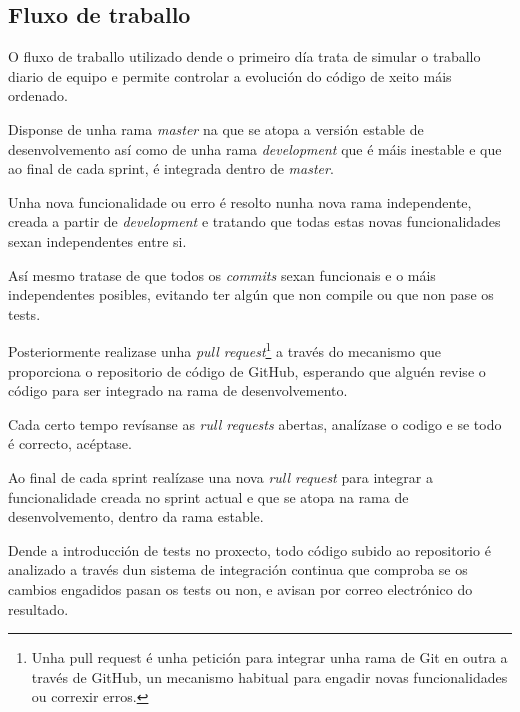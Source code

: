     \subsection{Fluxo de traballo}
    O fluxo de traballo utilizado dende o primeiro día trata de simular o 
traballo diario de equipo e permite controlar a evolución do código de xeito 
máis ordenado.

    Disponse de unha rama \emph{master} na que se atopa a versión estable de 
desenvolvemento así como de unha rama \emph{development} que é máis inestable e 
que ao final de cada sprint, é integrada dentro de \emph{master}.

    Unha nova funcionalidade ou erro é resolto nunha nova rama independente,
creada a partir de \emph{development} e tratando que todas estas novas 
funcionalidades sexan independentes entre si.

    Así mesmo tratase de que todos os \emph{commits} sexan funcionais e o máis 
independentes posibles, evitando ter algún que non compile ou que non pase 
os tests.

    Posteriormente realizase unha \emph{pull request}\footnote{Unha pull 
request é unha petición para integrar unha rama de Git en outra a través de 
GitHub, un mecanismo habitual para engadir novas funcionalidades ou correxir 
erros.} a través do mecanismo que proporciona o repositorio 
de código de GitHub, esperando que alguén revise o código para ser 
integrado na rama de desenvolvemento.

    Cada certo tempo revísanse as \emph{rull requests} abertas, analízase o 
codigo e se todo é correcto, acéptase.

    Ao final de cada sprint realízase una nova \emph{rull request} para 
integrar a funcionalidade creada no sprint actual e que se atopa na rama de 
desenvolvemento, dentro da rama estable.

    Dende a introducción de tests no proxecto, todo código subido ao 
repositorio é analizado a través dun sistema de integración continua que 
comproba se os cambios engadidos pasan os tests ou non, e avisan por correo 
electrónico do resultado.

